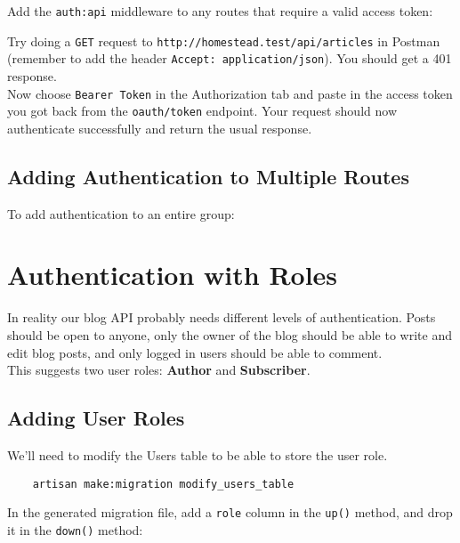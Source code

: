 Add the \texttt{auth:api} middleware to any routes that require a valid access token:


Try doing a \texttt{GET} request to \texttt{http://homestead.test/api/articles} in Postman (remember to add the header \texttt{Accept: application/json}). You should get a 401 response.
\\

Now choose \texttt{Bearer Token} in the Authorization tab and paste in the access token you got back from the \texttt{oauth/token} endpoint. Your request should now authenticate successfully and return the usual response.

\subsection{Adding Authentication to Multiple Routes}

To add authentication to an entire group:




\section{Authentication with Roles}

In reality our blog API probably needs different levels of authentication. Posts should be open to anyone, only the owner of the blog should be able to write and edit blog posts, and only logged in users should be able to comment.
\\

This suggests two user roles: \textbf{Author} and \textbf{Subscriber}.


\subsection{Adding User Roles}

We'll need to modify the Users table to be able to store the user role.

\begin{verbatim}
    artisan make:migration modify_users_table
\end{verbatim}

In the generated migration file, add a \texttt{role} column in the \texttt{up()} method, and drop it in the \texttt{down()} method:


